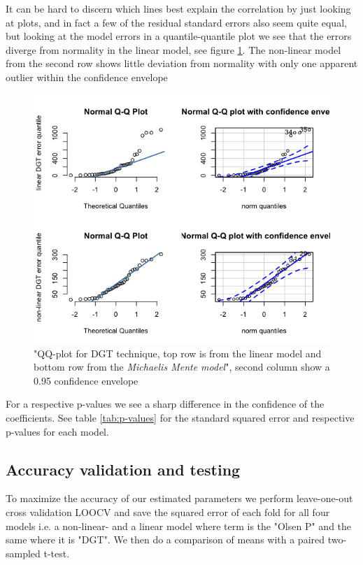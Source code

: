 \documentclass{article}
\begin{document}
It can be hard to discern which lines best explain the correlation by just looking at plots, and in fact a few of the residual standard errors also seem quite equal, but looking at the model errors in a quantile-quantile plot we see that the errors diverge from normality in the linear model, see figure \ref{fig:qqplot}. The non-linear model from the second row shows little deviation from normality with only one apparent outlier within the confidence envelope
\begin{figure}[H]
	\includegraphics[width=\linewidth]{qqplot.png}
	\caption{"QQ-plot for DGT technique, top row is from the linear model and bottom row from the \textit{Michaelis Mente model}", second column show a 0.95 confidence envelope}
	\label{fig:qqplot}
\end{figure}

For a  respective p-values we see a sharp difference in the confidence of the coefficients. See table \ref{tab:p-values} for the standard squared error and respective p-values for each model.


\subsection{Accuracy validation and testing}
To maximize the accuracy of our estimated parameters we perform leave-one-out cross validation LOOCV and save the squared error of each fold for all four  models i.e. a non-linear- and a linear model where term is the "Olsen P" and the same where it is "DGT". We then do a comparison of means with a paired two-sampled t-test.
\end{document}
